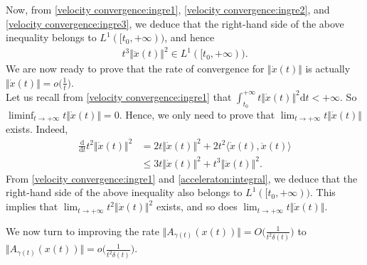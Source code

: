 \documentclass[11pt]{article}
\numberwithin{equation}{section}
\begin{document}
Now, from \eqref{velocity convergence:ingre1}, \eqref{velocity convergence:ingre2}, and \eqref{velocity convergence:ingre3}, we deduce that the right-hand side of the above inequality belongs to $L^1([t_0,+\infty))$, and hence 
\begin{align}
\label{acceleraton:integral}
t^3\Vert \ddot{x}(t)\Vert^2 \in L^1([t_0,+\infty)).
\end{align}
We are now ready to prove that the rate of convergence for $\Vert \dot{x}(t)\Vert$ is actually $\Vert \dot{x}(t)\Vert=o\big(\frac{1}{t}\big)$. \\
Let us recall from \eqref{velocity convergence:ingre1} that $\int_{t_0}^{+\infty} t\Vert \dot{x}(t) \Vert^2 \mathrm{d}t < +\infty$. So $\liminf_{t\rightarrow+\infty}t\Vert \dot{x}(t) \Vert =0$. Hence, we only need to prove that $\lim_{t \rightarrow+\infty}t\Vert \dot{x}(t) \Vert$ exists. Indeed, 
\begin{align*}
\frac{\mathrm{d}}{\mathrm{d}t} t^2\Vert\dot{x}(t)\Vert^2 &=2t\Vert \dot{x}(t) \Vert^2+2t^2\langle \dot{x}(t),\ddot{x}(t)\rangle \\
&\le3t\Vert \dot{x}(t) \Vert^2 + t^3\Vert \ddot{x}(t) \Vert^2.
\end{align*}
From \eqref{velocity convergence:ingre1} and \eqref{acceleraton:integral}, we deduce that the right-hand side of the above inequality also belongs to $L^1([t_0,+\infty))$. This implies that $\lim_{t \rightarrow+\infty}t^2\Vert \dot{x}(t) \Vert^2$ exists, and so does $\lim_{t \rightarrow+\infty}t\Vert \dot{x}(t) \Vert$. 

We now turn to improving the rate $\Big\Vert A_{\gamma(t)}(x(t)) \Big\Vert={O}\Big(\frac{1}{t^2\delta(t)}\Big)$ to $\Big\Vert A_{\gamma(t)}(x(t)) \Big\Vert=o\Big(\frac{1}{t^2\delta(t)}\Big)$. 
\end{document}
